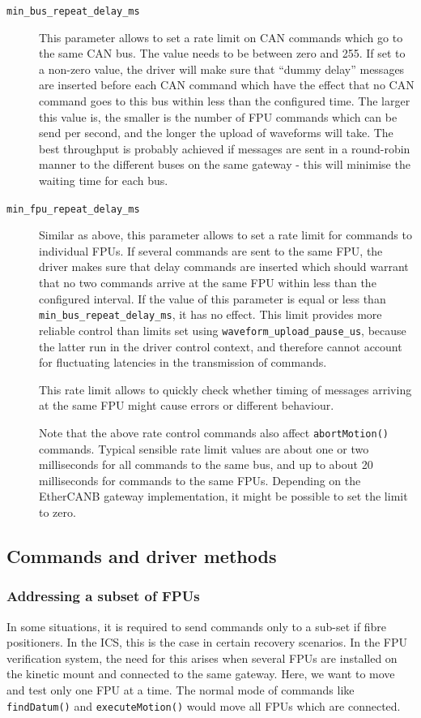 \documentclass[11pt,a4paper]{scrartcl}
\begin{document}
\begin{description}
\item[\texttt{min\_bus\_repeat\_delay\_ms}] This parameter allows to
  set a rate limit on CAN commands which go to the same CAN bus. The
  value needs to be between zero and 255. If set to a non-zero value,
  the driver will make sure that ``dummy delay'' messages are inserted
  before each CAN command which have the effect that no CAN command
  goes to this bus within less than the configured time. The larger
  this value is, the smaller is the number of FPU commands which can
  be send per second, and the longer the upload of waveforms will
  take. The best throughput is probably achieved if messages are sent
  in a round-robin manner to the different buses on the same gateway -
  this will minimise the waiting time for each bus.
  
\item[\texttt{min\_fpu\_repeat\_delay\_ms}] Similar as above, this
  parameter allows to set a rate limit for commands to individual
  FPUs. If several commands are sent to the same FPU, the driver makes
  sure that delay commands are inserted which should warrant that no
  two commands arrive at the same FPU within less than the configured
  interval. If the value of this parameter is equal or less than
  \texttt{min\_bus\_repeat\_delay\_ms}, it has no effect. This limit
  provides more reliable control than limits set using
  \texttt{waveform\_upload\_pause\_us}, because the latter run in the
  driver control context, and therefore cannot account for fluctuating
  latencies in the transmission of commands.

  This rate limit allows to quickly check whether timing of messages
  arriving at the same FPU might cause errors or different behaviour.

  Note that the above rate control commands also affect
  \texttt{abortMotion()} commands. Typical sensible rate limit values
  are about one or two milliseconds for all commands to the same bus,
  and up to about 20 milliseconds for commands to the same FPUs.
  Depending on the EtherCANB gateway implementation, it might be
  possible to set the limit to zero.

  
\end{description}


\subsection{Commands and driver methods}
\label{sec:commands}

\subsubsection{Addressing a subset of FPUs}
\label{sec:subsets}
 In some situations, it is required
to send commands only to a sub-set if fibre positioners. In the ICS,
this is the case in certain recovery scenarios.  In the FPU
verification system, the need for this arises when several FPUs are
installed on the kinetic mount and connected to the same
gateway. Here, we want to move and test only one FPU at a time. The
normal mode of commands like \texttt{findDatum()} and
\texttt{executeMotion()} would move all FPUs which are connected.
\end{document}
